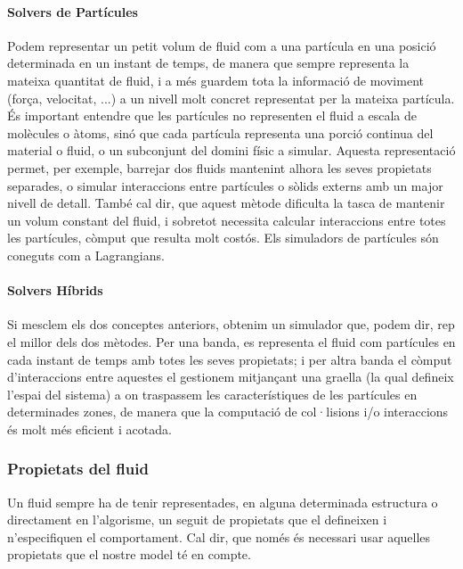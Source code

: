 \documentclass[a4paper]{report}
\begin{document}
	\paragraph[Partícules]{Solvers de Partícules} Podem representar un petit volum de fluid com a una partícula en una posició determinada en un instant de temps, de manera que sempre representa la mateixa quantitat de fluid, i a més guardem tota la informació de moviment (força, velocitat, ...) a un nivell molt concret representat per la mateixa partícula. \newline
	És important entendre que les partícules no representen el fluid a escala de molècules o àtoms, sinó que cada partícula representa una porció continua del material o fluid, o un subconjunt del domini físic a simular.
	\newline
	Aquesta representació permet, per exemple, barrejar dos fluids mantenint alhora les seves propietats separades, o simular interaccions entre partícules o sòlids externs amb un major nivell de detall.
	També cal dir, que aquest mètode dificulta la tasca de mantenir un volum constant del fluid, i sobretot necessita calcular interaccions entre totes les partícules, còmput que resulta molt costós. \newline
	Els simuladors de partícules són coneguts com a Lagrangians.
	
	\paragraph[Híbrids]{Solvers Híbrids} Si mesclem els dos conceptes anteriors, obtenim un simulador que, podem dir, rep el millor dels dos mètodes.\newline
	Per una banda, es representa el fluid com partícules en cada instant de temps amb totes les seves propietats; i per altra banda el còmput d'interaccions entre aquestes el gestionem mitjançant una graella (la qual defineix l'espai del sistema) a on traspassem les característiques de les partícules en determinades zones, de manera que la computació de col·lisions i/o interaccions és molt més eficient i acotada.
	
	\subsubsection{Propietats del fluid} 
	Un fluid sempre ha de tenir representades, en alguna determinada estructura o directament en l'algorisme, un seguit de propietats que el defineixen i n'especifiquen el comportament. Cal dir, que només és necessari usar aquelles propietats que el nostre model té en compte.
\end{document}
